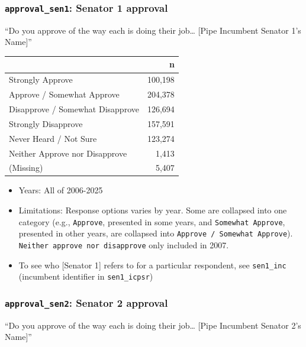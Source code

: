 \documentclass[10pt,article,oneside]{memoir}
\begin{document}
\subsubsection{\texorpdfstring{\texttt{approval\_sen1}: Senator 1
approval}{approval\_sen1: Senator 1 approval}}\label{approval_sen1-senator-1-approval}

``Do you approve of the way each is doing their job\ldots{} {[}Pipe
Incumbent Senator 1's Name{]}''

\begin{table}[H]
\centering
\begin{tabular}[t]{lr}
\toprule
 & n\\
\midrule
Strongly Approve & 100,198\\
Approve / Somewhat Approve & 204,378\\
Disapprove / Somewhat Disapprove & 126,694\\
Strongly Disapprove & 157,591\\
Never Heard / Not Sure & 123,274\\
Neither Approve nor Disapprove & 1,413\\
(Missing) & 5,407\\
\bottomrule
\end{tabular}
\end{table}

\begin{itemize}
\tightlist
\item
  Years: All of 2006-2025
\item
  Limitations: Response options varies by year. Some are collapsed into
  one category (e.g., \texttt{Approve}, presented in some years, and
  \texttt{Somewhat\ Approve}, presented in other years, are collapsed
  into \texttt{Approve\ /\ Somewhat\ Approve}).
  \texttt{Neither\ approve\ nor\ disapprove} only included in 2007.
\item
  To see who {[}Senator 1{]} refers to for a particular respondent, see
  \texttt{sen1\_inc} (incumbent identifier in \texttt{sen1\_icpsr})
\end{itemize}

\subsubsection{\texorpdfstring{\texttt{approval\_sen2}: Senator 2
approval}{approval\_sen2: Senator 2 approval}}\label{approval_sen2-senator-2-approval}

``Do you approve of the way each is doing their job\ldots{} {[}Pipe
Incumbent Senator 2's Name{]}''
\end{document}
